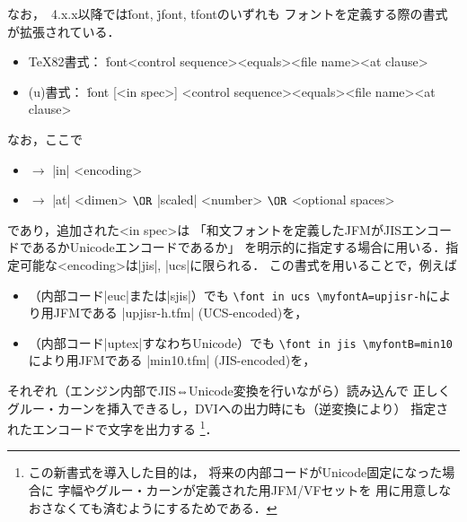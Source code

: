 \documentclass[a4paper,11pt,nomag,dvipdfmx]{jsarticle}
\def\_{\leavevmode\vrule width .45em height -.2ex depth .3ex\relax}
\begin{document}
\ifx\ptextracingfonts\undefined\else
%
なお，\pTeX~4.x.x以降では\.{font}, \.{jfont}, \.{tfont}のいずれも
フォントを定義する際の書式が拡張されている．
\begin{itemize}
 \item \TeX82書式：
   \.{font}<control sequence><equals><file name><at clause>
 \item (u)\pTeX 書式：
   \.{font} [<in spec>] <control sequence><equals><file name><at clause>
\end{itemize}
なお，ここで
\begin{itemize}
 \item <in spec> $\longrightarrow$ |in| <encoding>
 \item <at clause> $\longrightarrow$ |at| <dimen> $\OR$ |scaled| <number> $\OR$ <optional spaces>
\end{itemize}
であり，追加された<in spec>は
「和文フォントを定義したJFMがJISエンコードであるかUnicodeエンコードであるか」
を明示的に指定する場合に用いる．指定可能な<encoding>は|jis|, |ucs|に限られる．
この書式を用いることで，例えば
\begin{itemize}
 \item \pTeX（内部コード|euc|または|sjis|）でも
   \verb|\font in ucs \myfontA=upjisr-h|により\upTeX 用JFMである
   |upjisr-h.tfm| (UCS-encoded)を，
 \item \upTeX（内部コード|uptex|すなわちUnicode）でも
   \verb|\font in jis \myfontB=min10|により\pTeX 用JFMである
   |min10.tfm| (JIS-encoded)を，
\end{itemize}
それぞれ（エンジン内部でJIS⇔Unicode変換を行いながら）読み込んで
正しくグルー・カーンを挿入できるし，DVIへの出力時にも（逆変換により）
指定されたエンコードで文字を出力する
\footnote{この新書式を導入した目的は，
将来\upTeX の内部コードがUnicode固定になった場合に
字幅やグルー・カーンが定義された\pTeX 用JFM/VFセットを
\upTeX 用に用意しなおさなくても済むようにするためである\cite{tjb149}．}．
\end{document}
